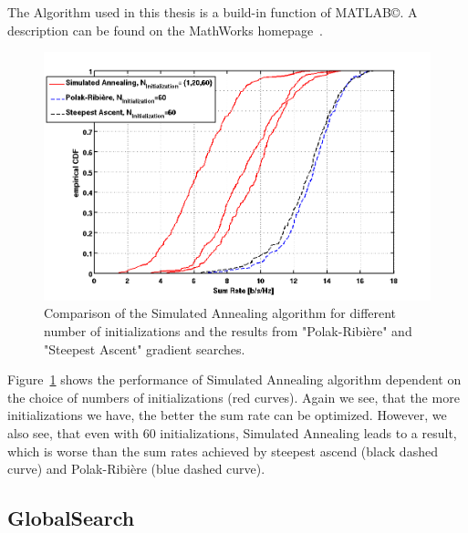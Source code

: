 The Algorithm used in this thesis is a build-in function of MATLAB\copyright.
A description can be found on the MathWorks homepage~\cite{matlab:simulann}.

\begin{figure}[h]
\centering
  \includegraphics[width=0.9\linewidth]{images/Simannealcomparison.png}
\caption{Comparison of the Simulated Annealing algorithm for different number of initializations and the results from "Polak-Ribi\`{e}re" and "Steepest Ascent" gradient searches.}
\label{fig:heur_sa}
\end{figure}

Figure~\ref{fig:heur_sa} shows the performance of Simulated Annealing algorithm dependent on the choice of numbers of initializations (red curves).
Again we see, that the more initializations we have, the better the sum rate can be optimized.
However, we also see, that even with 60 initializations, Simulated Annealing leads to a result, which is worse than the sum rates achieved by steepest ascend (black dashed curve) and Polak-Ribi\`{e}re (blue dashed curve).


\subsection{GlobalSearch}
\label{sec:globals}

